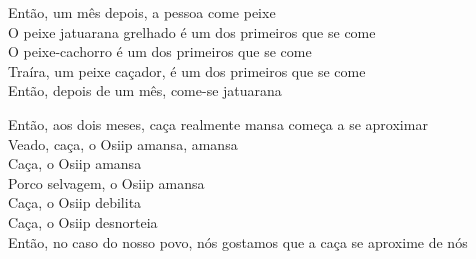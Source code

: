 \bigskip

\begin{linenumbers}
 
\noindent Então, um mês depois, a pessoa come peixe\\
 O peixe jatuarana grelhado é um dos primeiros que se come\\
 O peixe-cachorro é um dos primeiros que se come\\
 Traíra, um peixe caçador, é um dos primeiros que se come\\
 Então, depois de um mês, come-se jatuarana
 
\end{linenumbers}

\bigskip

\begin{linenumbers}
 
\noindent Então, aos dois meses, caça realmente mansa começa a se aproximar\\
 Veado, caça, o Osiip amansa, amansa\\
 Caça, o Osiip amansa\\
 Porco selvagem, o Osiip amansa\\
 Caça, o Osiip debilita\\
 Caça, o Osiip desnorteia\\
 Então, no caso do nosso povo, nós gostamos que a caça se aproxime de nós
 
\end{linenumbers}

\bigskip


